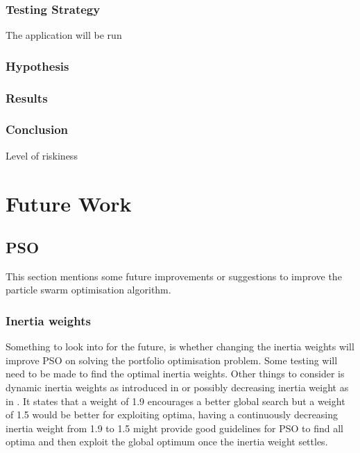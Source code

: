 \documentclass{pdfmx4020}
\begin{document}
    \subsection{Testing Strategy}
      The application will be run

    \subsection{Hypothesis}

    \subsection{Results}

    \subsection{Conclusion}

    Level of riskiness



\chapter{Future Work}

  \section{PSO} %
  \label{sec:pso}
  This section mentions some future improvements or suggestions to improve the particle swarm optimisation algorithm.
    \subsection{Inertia weights} %
    \label{sub:inertia_weights2}
      Something to look into for the future, is whether changing the inertia weights will improve PSO on solving the portfolio optimisation problem. Some testing will need to be made to find the optimal inertia weights. Other things to consider is dynamic inertia weights as introduced in \cite{dynamic_inertia} or possibly decreasing inertia weight as in \cite{inertia}. It states that a weight of 1.9 encourages a better global search but a weight of 1.5 would be better for exploiting optima, having a continuously decreasing inertia weight from 1.9 to 1.5 might provide good guidelines for PSO to find all optima and then exploit the global optimum once the inertia weight settles. 
\end{document}
